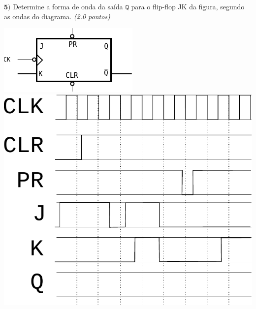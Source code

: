\documentclass[12pt]{article}
\newcommand{\exerc}[3]{ \vspace*{25pt} {$\mathbf{#1)}$} #2 \hfill {\it #3} }
\begin{document}
\exerc{5}{Determine a forma de onda da saída $\mathtt{Q}$ para o flip-flop JK da figura, segundo as ondas do diagrama.}{(2.0 pontos)}
\\
\begin{multicols}{2}
\begin{center}
\includegraphics{fp-jk} \\ \vspace{15pt}
\includegraphics[scale=0.5]{sig1} \\
\end{center}
\end{multicols}
\end{document}
